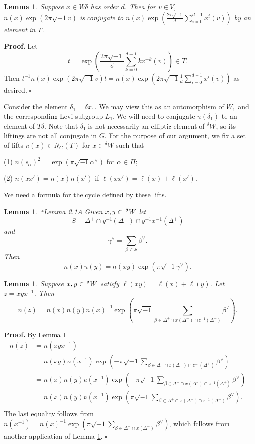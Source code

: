 \documentclass[10pt,leqno]{article}
\newtheorem{lemma}[equation]{Lemma}
\newcommand{\qed}{\hfill $\square$ \medskip}
\newenvironment{proof}[1][Proof]{\noindent\textbf{#1.} }{\qed}
\renewcommand{\a}{\mathfrak a}
\newcommand{\ch}[1]{#1^\vee}
\newcommand\inv{^{-1}}
\newcommand{\Wext}{\negthinspace\negthinspace\phantom{a}^\delta W}
\def\a{\alpha}
\def\b{\beta}
\def\d{\delta}
\begin{document}
\begin{lemma} \label{average}
  Suppose $x \in W \d$ has order $d$.  Then  for $v\in V$, $n(x)\exp(2 \pi \sqrt{-1} v)$ is conjugate to
  $n(x) \exp(\frac{2 \pi \sqrt{-1}}{d}\sum_{i=0}^{d-1} x^i(v))$ by an element in $T$.
\end{lemma}
\begin{proof}
Let
$$
t=\exp(\frac{2\pi \sqrt{-1} }{d}\sum_{k=0}^{d-1} k x^{-k}(v))\in T.
$$
Then $t^{-1} n(x)\exp(2 \pi \sqrt{-1} v) t = n(x) \exp(2\pi \sqrt{-1}\frac{1}{d}\sum_{i=0}^{d-1} x^i(v))$ as desired.
\end{proof}

Consider the element $\delta_1=\delta x_1$. We may view this as an
automorphism of $W_1$ and the corresponding Levi subgroup $L_1$.  We
will need to conjugate $n(\delta_1)$ to an element of $T\delta$.
Note that $\d_1$ is not necessarily  an elliptic element of ${}^\d W$, so its liftings are not all conjugate in $G$.
For the purpose of our
argument, we fix a set of lifts $n(x) \in N_G(T)$ for $x \in {}^\d W$
such that

(1) $n(s_\a)^2=\exp(\pi \sqrt{-1} \a^\vee)$ for $\a \in \Pi$;

(2) $n(x x') = n(x) n(x')$ if $\ell(x x') = \ell(x) + \ell(x')$.

We need a formula for the cycle defined by these lifts.
\begin{lemma} \label{factor}{\cite{ls}*{Lemma 2.1A}}
  Given $x,y\in \Wext$ let
  $$
  S=\Delta^+\cap y\inv(\Delta^-)\cap y\inv x\inv(\Delta^+)
$$
and
$$
\ch\gamma=\sum_{\beta\in S}\ch\beta.
$$
Then
$$
n(x)n(y)=n(xy)\exp(\pi \sqrt{-1}\gamma^\vee). 
$$
\end{lemma}

\begin{lemma}
  \label{l:n(z)}
  Suppose $x,y\in\Wext$ satisfy $\ell(xy)=\ell(x)+\ell(y)$.
  Let $z=xyx\inv$.  Then
$$
n(z)=n(x)n(y)n(x)\inv \exp(\pi \sqrt{-1} \sum_{\beta\in \Delta^+\cap x(\Delta^-)\cap z\inv(\Delta^-)}\ch\beta).
$$
  
\end{lemma}

\begin{proof}
By Lemma \ref{factor}
$$
\begin{aligned}
  n(z)&=n(xyx\inv)\\
  &=n(xy)n(x\inv)\exp(-\pi \sqrt{-1}\sum_{\b \in \Delta^+\cap x(\Delta^-)\cap z\inv(\Delta^+)}\ch\beta)\\
  &=n(x)n(y)n(x\inv)\exp(-\pi \sqrt{-1}\sum_{\b \in \Delta^+\cap x(\Delta^-)\cap z\inv(\Delta^+)}\ch\beta)\\
  &=n(x)n(y)n(x\inv)\exp(\pi \sqrt{-1}\sum_{\b \in \Delta^+\cap x(\Delta^-)\cap z\inv(\Delta^-)}\ch\beta).\\
\end{aligned}
$$
The last equality follows from 
$n(x\inv)=n(x)\inv\exp(\pi \sqrt{-1}\sum_{\b \in \Delta^+\cap x(\Delta^-)}\ch\beta)$, which follows from another application of Lemma \ref{factor}.
\end{proof}
\end{document}
